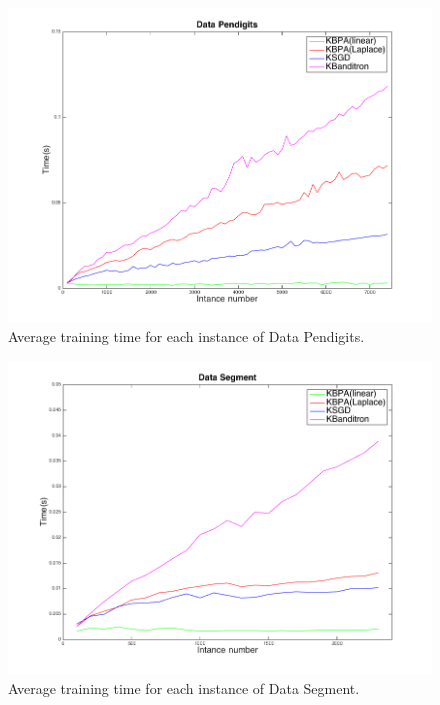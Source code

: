 \documentclass[preprint,12pt,authoryear]{elsarticle}
\begin{document}
\begin{figure}[t!]
	\includegraphics[width=\linewidth]{figs/Pendigits_kernel_T.png}
	\caption{Average training time for each instance of Data Pendigits.}
	\label{pic:PKT}
\end{figure}

\begin{figure}[t!]
	\centerline{
		\includegraphics[width=\linewidth]{figs/Segment_kernel_T.png}}
	\caption{Average training time for each instance of Data Segment.}
	\label{pic:SKT}
\end{figure}
\end{document}

